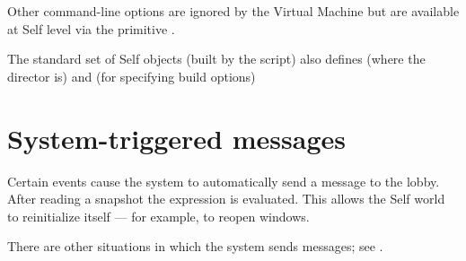 \documentclass[letterpaper,10pt,english]{sphinxmanual}
\begin{document}
Other command-line options are ignored by the Virtual Machine but are available at Self level via
the primitive .

The standard set of Self objects (built by the  script) also defines  (where the  director is) and  (for specifying build options)


\section{System-triggered messages}
\label{\detokenize{vmref:system-triggered-messages}}
Certain events cause the system to automatically send a message to the lobby. After reading a snapshot
the expression  is evaluated. This allows the Self world to
reinitialize itself — for example, to reopen windows.

There are other situations in which the system sends messages; see {\hyperref[\detokenize{vmref:run-time-message-lookup-errors}]{}}.

\end{document}
